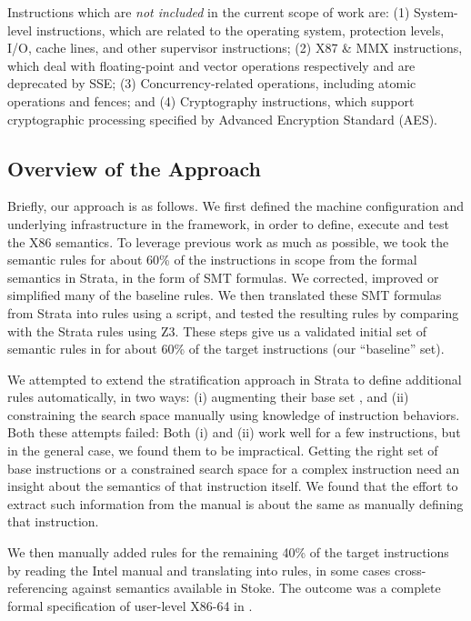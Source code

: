 Instructions which are \emph{not included} in the current scope of work are: 
(1) System-level instructions, which are related to the operating system, 
protection levels, I/O, cache lines, and other supervisor instructions; 
(2) X87 \& MMX instructions, which deal with floating-point and vector 
operations respectively and are deprecated by SSE; 
(3) Concurrency-related operations, including atomic operations and fences; and 
(4) Cryptography instructions, which support cryptographic processing specified by Advanced Encryption Standard (AES).

\subsection{Overview of the Approach}
\label{sec:Approach:Overview}

Briefly, our approach is as follows.
%
We first defined the machine configuration and underlying infrastructure in the \K framework, in order to define, execute and test the X86 semantics.
%
To leverage previous work as much as possible, we took the semantic rules for about 60\% of the instructions in scope from the formal semantics in Strata, in the form of SMT formulas.
%
We corrected, improved or simplified many of the baseline rules.
%
We then translated these SMT formulas from Strata into \K rules using a script, and tested the resulting rules by comparing with the Strata rules using Z3.
%
These steps give us a validated initial set of semantic rules in \K for about 60\% of the target instructions (our ``baseline'' set).

We attempted to extend the stratification approach in Strata to define additional rules automatically, in two ways: (i) augmenting their base set , and (ii) constraining the search space manually using knowledge of instruction behaviors.  Both these attempts failed: Both (i) and (ii) work well for a few instructions, but in the general case, we found them to be impractical.  Getting the right set of base instructions or a constrained search space for a complex instruction need an insight about the semantics of that instruction itself. We found that the effort to extract such information from the manual is about the same  as manually defining that instruction.


We then manually added \K rules for the remaining 40\% of the target instructions by reading the Intel manual and translating into \K rules, in some cases cross-referencing against semantics available in Stoke.
%
The outcome was a complete formal specification of user-level X86-64 in \K.

